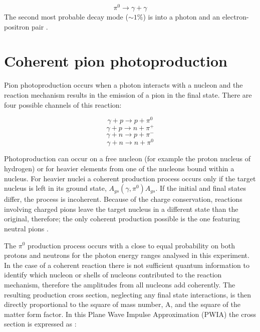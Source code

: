 \begin{equation}
\pi^{0} \rightarrow \gamma + \gamma
\end{equation}
The second most probable decay mode ($\sim1\%$) is into a photon and an electron-positron pair \cite{amsler}.

\section{Coherent pion photoproduction}

\indent Pion photoproduction occurs when a photon interacts with a nucleon and the reaction mechanism results in the emission of a pion in the final state. There are four possible channels of this reaction:

\begin{equation}
\gamma + p \rightarrow p + \pi^{0}
\end{equation}
\begin{equation}
\gamma + p \rightarrow n + \pi^{+}
\end{equation}
\begin{equation}
\gamma + n \rightarrow p + \pi^{-}
\end{equation}
\begin{equation}
\gamma + n \rightarrow n + \pi^{0}
\end{equation}

\indent Photoproduction can occur on a free nucleon (for example the proton nucleus of hydrogen) or for heavier elements from one of the nucleons bound within a nucleus. For heavier nuclei a coherent production process occurs only if the target nucleus is left in its ground state, $A_{gs}(\gamma,\pi^{0})A_{gs}$. If the initial and final states differ, the process is incoherent. Because of the charge conservation, reactions involving charged pions leave the target nucleus in a different state than the original, therefore; the only coherent production possible is the one featuring neutral pions \cite{claire}.

\indent The $\pi^{0}$ production process occurs with a close to equal probability on both protons and neutrons for the photon energy ranges analysed in this experiment. In the case of a coherent reaction there is not sufficient quantum information to identify which nucleon or shells of nucleons contributed to the reaction mechanism, therefore the amplitudes from all nucleons add coherently. The resulting production cross section, neglecting any final state interactions,  is then directly proportional to the square of mass number, A, and the square of the matter form factor. In this Plane Wave Impulse Approximation (PWIA) the cross section is expressed as \cite{drechsel2}:

